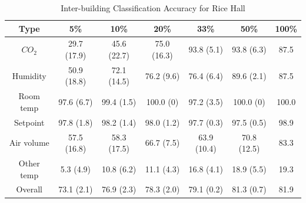 \begin{table}[ht!]
\centering %
\begin{tabular}{c | c | c | c | c | c | c}%
\hline %
Type & 5\% & 10\% & 20\% & 33\% & 50\% & 100\% \\ %
\hline\hline %
$CO_{2}$ & 29.7 (17.9) & 45.6 (22.7) & 75.0 (16.3) & 93.8 (5.1) & 93.8 (6.3) & 87.5\\ \hline
Humidity & 50.9 (18.8) & 72.1 (14.5) & 76.2 (9.6) & 76.4 (6.4) & 89.6 (2.1) & 87.5\\ \hline
Room temp & 97.6 (6.7) & 99.4 (1.5) & 100.0 (0) & 97.2 (3.5) & 100.0 (0) & 100.0\\ \hline
Setpoint & 97.8 (1.8) & 98.2 (1.4) & 98.0 (1.2) & 97.7 (0.3) & 97.5 (0.5) & 98.9\\ \hline
Air volume & 57.5 (16.8) & 58.3 (17.5) & 66.7 (7.5) & 63.9 (10.4) & 70.8 (12.5) & 83.3\\ \hline
Other temp & 5.3 (4.9) & 10.8 (6.2) & 11.1 (4.3) & 16.8 (4.1) & 18.9 (5.5) & 19.3\\ \hline
Overall & 73.1 (2.1) & 76.9 (2.3) & 78.3 (2.0) & 79.1 (0.2) & 81.3 (0.7) & 81.9\\ \hline
\end{tabular}
\caption{Inter-building Classification Accuracy for Rice Hall}
\label{table:rice_x} %
\end{table}

